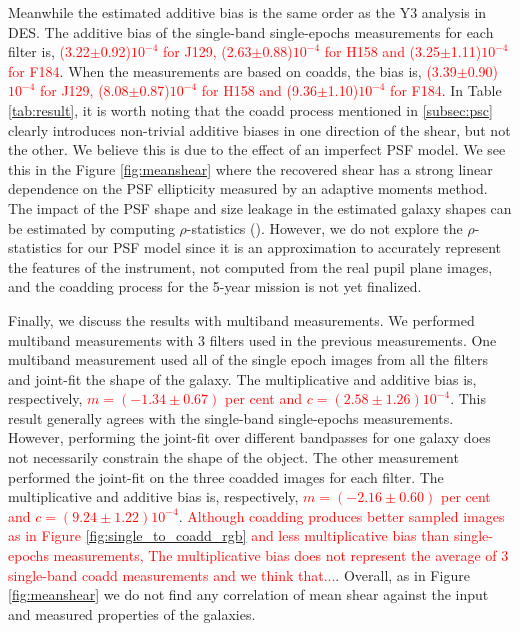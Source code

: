 \documentclass[fleqn,usenatbib]{mnras}
\begin{document}
Meanwhile the estimated additive bias is the same order as the Y3 analysis in DES. The additive bias of the single-band single-epochs measurements for each filter is, \textcolor{red}{(3.22$\pm$0.92)$10^{-4}$ for J129, (2.63$\pm$0.88)$10^{-4}$ for H158 and (3.25$\pm$1.11)$10^{-4}$ for F184}. When the measurements are based on coadds, the bias is, \textcolor{red}{(3.39$\pm$0.90)$10^{-4}$ for J129, (8.08$\pm$0.87)$10^{-4}$ for H158 and (9.36$\pm$1.10)$10^{-4}$ for F184}. In Table \ref{tab:result}, it is worth noting that the coadd process mentioned in \ref{subsec:psc} clearly introduces non-trivial additive biases in one direction of the shear, but not the other. We believe this is due to the effect of an imperfect PSF model. We see this in the Figure \ref{fig:meanshear} where the recovered shear has a strong linear dependence on the PSF ellipticity measured by an adaptive moments method. The impact of the PSF shape and size leakage in the estimated galaxy shapes can be estimated by computing $\rho$-statistics (\citealt{2008A&A...484...67P, 2010MNRAS.404..350R, 2016MNRAS.460.2245J}). However, we do not explore the $\rho$-statistics for our PSF model since it is an approximation to accurately represent the features of the instrument, not computed from the real pupil plane images, and the coadding process for the 5-year mission is not yet finalized. 


Finally, we discuss the results with multiband measurements. We performed multiband measurements with 3 filters used in the previous measurements. One multiband measurement used all of the single epoch images from all the filters and joint-fit the shape of the galaxy. The multiplicative and additive bias is, respectively, \textcolor{red}{$m=(-1.34\pm0.67)$ per cent and $c=(2.58\pm1.26)10^{-4}$}. This result generally agrees with the single-band single-epochs measurements. However, performing the joint-fit over different bandpasses for one galaxy does not necessarily constrain the shape of the object. The other measurement performed the joint-fit on the three coadded images for each filter. The multiplicative and additive bias is, respectively, \textcolor{red}{$m=(-2.16\pm0.60)$ per cent and $c=(9.24\pm1.22)10^{-4}$}. \textcolor{red}{Although coadding produces better sampled images as in Figure \ref{fig:single_to_coadd_rgb} and less multiplicative bias than single-epochs measurements, The multiplicative bias does not represent the average of 3 single-band coadd measurements and we think that...}. Overall, as in Figure \ref{fig:meanshear} we do not find any correlation of mean shear against the input and measured properties of the galaxies.
\end{document}
